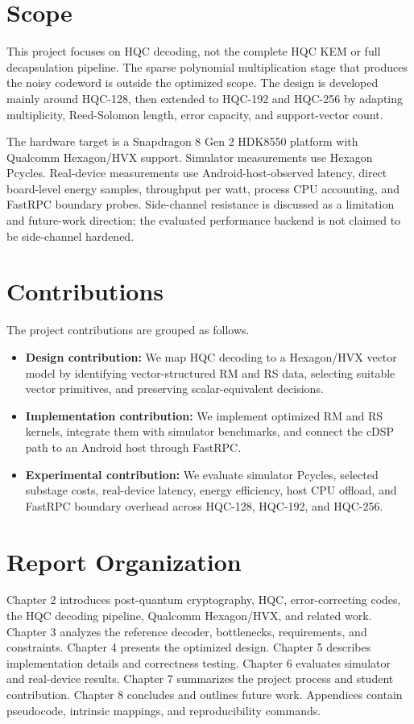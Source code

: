 \documentclass[12pt,a4paper]{report}
\begin{document}
\section{Scope}
This project focuses on HQC decoding, not the complete HQC KEM or full decapsulation pipeline. The sparse polynomial multiplication stage that produces the noisy codeword is outside the optimized scope. The design is developed mainly around HQC-128, then extended to HQC-192 and HQC-256 by adapting multiplicity, Reed-Solomon length, error capacity, and support-vector count.

The hardware target is a Snapdragon 8 Gen 2 HDK8550 platform with Qualcomm Hexagon/HVX support. Simulator measurements use Hexagon Pcycles. Real-device measurements use Android-host-observed latency, direct board-level energy samples, throughput per watt, process CPU accounting, and FastRPC boundary probes. Side-channel resistance is discussed as a limitation and future-work direction; the evaluated performance backend is not claimed to be side-channel hardened.

\section{Contributions}
The project contributions are grouped as follows.
\begin{itemize}
  \item \textbf{Design contribution:} We map HQC decoding to a Hexagon/HVX vector model by identifying vector-structured RM and RS data, selecting suitable vector primitives, and preserving scalar-equivalent decisions.
  \item \textbf{Implementation contribution:} We implement optimized RM and RS kernels, integrate them with simulator benchmarks, and connect the cDSP path to an Android host through FastRPC.
  \item \textbf{Experimental contribution:} We evaluate simulator Pcycles, selected substage costs, real-device latency, energy efficiency, host CPU offload, and FastRPC boundary overhead across HQC-128, HQC-192, and HQC-256.
\end{itemize}

\section{Report Organization}
Chapter 2 introduces post-quantum cryptography, HQC, error-correcting codes, the HQC decoding pipeline, Qualcomm Hexagon/HVX, and related work. Chapter 3 analyzes the reference decoder, bottlenecks, requirements, and constraints. Chapter 4 presents the optimized design. Chapter 5 describes implementation details and correctness testing. Chapter 6 evaluates simulator and real-device results. Chapter 7 summarizes the project process and student contribution. Chapter 8 concludes and outlines future work. Appendices contain pseudocode, intrinsic mappings, and reproducibility commands.
\end{document}
